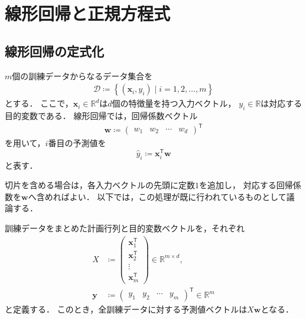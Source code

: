 \section{線形回帰と正規方程式}
\label{sec:linear-regression-normal-equation}

\subsection{線形回帰の定式化}
\label{subsec:linear-regression-formulation}

$m$個の訓練データからなるデータ集合を
\begin{align*}
  \mathcal{D}
  \coloneq
  \left\{(\bm{x}_i,y_i)\mid i=1,2,\ldots,m\right\}
\end{align*}
とする．
ここで，$\bm{x}_i\in\mathbb{R}^{d}$は$d$個の特徴量を持つ入力ベクトル，
$y_i\in\mathbb{R}$は対応する目的変数である．
線形回帰では，回帰係数ベクトル
\begin{align*}
  \bm{w}
  \coloneq
  \begin{pmatrix}
    w_1 & w_2 & \cdots & w_d
  \end{pmatrix}^{\mathsf{T}}
\end{align*}
を用いて，$i$番目の予測値を
\begin{equation}
  \widehat{y}_i
  \coloneq
  \bm{x}_i^{\mathsf{T}}\bm{w}
  \label{eq:linear-regression-prediction}
\end{equation}
と表す．

切片を含める場合は，各入力ベクトルの先頭に定数$1$を追加し，
対応する回帰係数を$\bm{w}$へ含めればよい．
以下では，この処理が既に行われているものとして議論する．

訓練データをまとめた計画行列と目的変数ベクトルを，それぞれ
\begin{align}
  X
  &\coloneq
  \begin{pmatrix}
    \bm{x}_1^{\mathsf{T}}\\
    \bm{x}_2^{\mathsf{T}}\\
    \vdots\\
    \bm{x}_m^{\mathsf{T}}
  \end{pmatrix}
  \in\mathbb{R}^{m\times d},
  \label{eq:design-matrix}\\
  \bm{y}
  &\coloneq
  \begin{pmatrix}
    y_1 & y_2 & \cdots & y_m
  \end{pmatrix}^{\mathsf{T}}
  \in\mathbb{R}^{m}
  \label{eq:target-vector}
\end{align}
と定義する．
このとき，全訓練データに対する予測値ベクトルは$X\bm{w}$となる．

